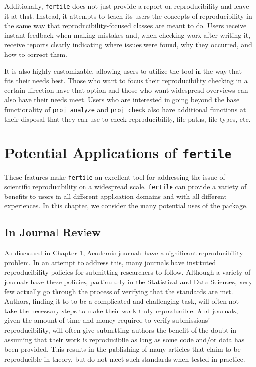 \documentclass[12pt,twoside]{reedthesis}
\begin{document}
Additionally, \texttt{fertile} does not just provide a report on reproducibility and leave it at that. Instead, it attempts to teach its users the concepts of reproducibility in the same way that reproducibility-focused classes are meant to do. Users receive instant feedback when making mistakes and, when checking work after writing it, receive reports clearly indicating where issues were found, why they occurred, and how to correct them.

It is also highly customizable, allowing users to utilize the tool in the way that fits their needs best. Those who want to focus their reproducibility checking in a certain direction have that option and those who want widespread overviews can also have their needs meet. Users who are interested in going beyond the base functionality of \texttt{proj\_analyze} and \texttt{proj\_check} also have additional functions at their disposal that they can use to check reproducibility, file paths, file types, etc.

\hypertarget{potential-applications-of-fertile}{%
\section{\texorpdfstring{Potential Applications of \texttt{fertile}}{Potential Applications of fertile}}\label{potential-applications-of-fertile}}

These features make \texttt{fertile} an excellent tool for addressing the issue of scientific reproducibility on a widespread scale. \texttt{fertile} can provide a variety of benefits to users in all different application domains and with all different experiences. In this chapter, we consider the many potential uses of the package.

\hypertarget{in-journal-review}{%
\subsection{In Journal Review}\label{in-journal-review}}

As discussed in Chapter 1, Academic journals have a significant reproducibility problem. In an attempt to address this, many journals have instituted reproducibility policies for submitting researchers to follow. Although a variety of journals have these policies, particularly in the Statistical and Data Sciences, very few actually go through the process of verifying that the standards are met. Authors, finding it to to be a complicated and challenging task, will often not take the necessary steps to make their work truly reproducible. And journals, given the amount of time and money required to verify submissions' reproducibility, will often give submitting authors the benefit of the doubt in assuming that their work is reproducibile as long as some code and/or data has been provided. This results in the publishing of many articles that claim to be reproducible in theory, but do not meet such standards when tested in practice.
\end{document}
